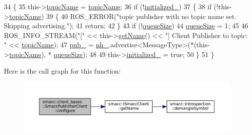 \begin{DoxyCode}
34   \{
35     this->\hyperlink{classsmacc_1_1client__bases_1_1SmaccPublisherClient_a8b8d98aef9b3b3a441005d2cb17b4fcc}{topicName} = \hyperlink{classsmacc_1_1client__bases_1_1SmaccPublisherClient_a8b8d98aef9b3b3a441005d2cb17b4fcc}{topicName};
36     \textcolor{keywordflow}{if} (!\hyperlink{classsmacc_1_1client__bases_1_1SmaccPublisherClient_acb2fbd8b9797ce286d9ecc0419e2cc55}{initialized\_})
37     \{
38       \textcolor{keywordflow}{if} (!this->\hyperlink{classsmacc_1_1client__bases_1_1SmaccPublisherClient_a8b8d98aef9b3b3a441005d2cb17b4fcc}{topicName})
39       \{
40         ROS\_ERROR(\textcolor{stringliteral}{"topic publisher with no topic name set. Skipping advertising."});
41         \textcolor{keywordflow}{return};
42       \}
43       \textcolor{keywordflow}{if} (!\hyperlink{classsmacc_1_1client__bases_1_1SmaccPublisherClient_a1a9b98681b01953f134191799a029fd3}{queueSize})
44         \hyperlink{classsmacc_1_1client__bases_1_1SmaccPublisherClient_a1a9b98681b01953f134191799a029fd3}{queueSize} = 1;
45 
46       ROS\_INFO\_STREAM(\textcolor{stringliteral}{"["} << this->\hyperlink{classsmacc_1_1ISmaccClient_a8c3ce19f182e71909c5dc6263d25be69}{getName}() << \textcolor{stringliteral}{"] Client Publisher to topic: "} << 
      \hyperlink{classsmacc_1_1client__bases_1_1SmaccPublisherClient_a8b8d98aef9b3b3a441005d2cb17b4fcc}{topicName});
47       \hyperlink{classsmacc_1_1client__bases_1_1SmaccPublisherClient_af39f498e73e8f956aae312065a4fd093}{pub\_} = \hyperlink{classsmacc_1_1client__bases_1_1SmaccPublisherClient_a83a44b5a1afd4d45140d4936f4011cc9}{nh\_}.advertise<MessageType>(*(this->\hyperlink{classsmacc_1_1client__bases_1_1SmaccPublisherClient_a8b8d98aef9b3b3a441005d2cb17b4fcc}{topicName}), *
      \hyperlink{classsmacc_1_1client__bases_1_1SmaccPublisherClient_a1a9b98681b01953f134191799a029fd3}{queueSize});
48 
49       this->\hyperlink{classsmacc_1_1client__bases_1_1SmaccPublisherClient_acb2fbd8b9797ce286d9ecc0419e2cc55}{initialized\_} = \textcolor{keyword}{true};
50     \}
51   \}
\end{DoxyCode}
Here is the call graph for this function\+:
\nopagebreak
\begin{figure}[H]
\begin{center}
\leavevmode
\includegraphics[width=350pt]{classsmacc_1_1client__bases_1_1SmaccPublisherClient_ade7a2549ada725b8342633137eb6ad53_cgraph}
\end{center}
\end{figure}
\mbox{\label{classsmacc_1_1client__bases_1_1SmaccPublisherClient_a083abb0f5c0f587f3381a58fe1fe3669}} 
